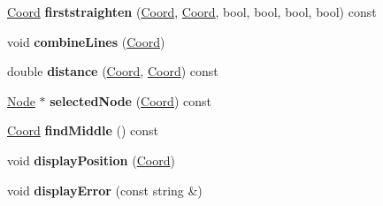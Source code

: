 \begin{DoxyCompactItemize}
\item 
\hypertarget{classGameGUI_a4900be71f21cecf0aafca9d9201b7c77}{\hyperlink{structCoord}{Coord} {\bfseries firststraighten} (\hyperlink{structCoord}{Coord}, \hyperlink{structCoord}{Coord}, bool, bool, bool, bool) const }\label{classGameGUI_a4900be71f21cecf0aafca9d9201b7c77}

\item 
\hypertarget{classGameGUI_aa12fbbd12f46981f02e78fbfd2a5d404}{void {\bfseries combine\+Lines} (\hyperlink{structCoord}{Coord})}\label{classGameGUI_aa12fbbd12f46981f02e78fbfd2a5d404}

\item 
\hypertarget{classGameGUI_ada539abb78b785c11172aa9bf4dfabf6}{double {\bfseries distance} (\hyperlink{structCoord}{Coord}, \hyperlink{structCoord}{Coord}) const }\label{classGameGUI_ada539abb78b785c11172aa9bf4dfabf6}

\item 
\hypertarget{classGameGUI_ac927454c0511580c102ddc739fd9a6df}{\hyperlink{classNode}{Node} $\ast$ {\bfseries selected\+Node} (\hyperlink{structCoord}{Coord}) const }\label{classGameGUI_ac927454c0511580c102ddc739fd9a6df}

\item 
\hypertarget{classGameGUI_a597ba4a997c9aca9d765ce1b43613001}{\hyperlink{structCoord}{Coord} {\bfseries find\+Middle} () const }\label{classGameGUI_a597ba4a997c9aca9d765ce1b43613001}

\item 
\hypertarget{classGameGUI_a346606e8f741b3fad9d9fcccdd4b4a5b}{void {\bfseries display\+Position} (\hyperlink{structCoord}{Coord})}\label{classGameGUI_a346606e8f741b3fad9d9fcccdd4b4a5b}

\item 
\hypertarget{classGameGUI_a414dd5716a93388919d89ca82ffb1d23}{void {\bfseries display\+Error} (const string \&)}\label{classGameGUI_a414dd5716a93388919d89ca82ffb1d23}

\end{DoxyCompactItemize}
